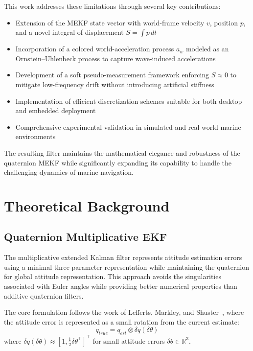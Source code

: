 \documentclass[11pt,letterpaper]{article}
\begin{document}
This work addresses these limitations through several key contributions:
\begin{itemize}
  \item Extension of the MEKF state vector with world-frame velocity $v$, position $p$, and a novel integral of displacement $S=\int p\,dt$
  \item Incorporation of a colored world-acceleration process $a_w$ modeled as an Ornstein--Uhlenbeck process to capture wave-induced accelerations
  \item Development of a soft pseudo-measurement framework enforcing $S\approx 0$ to mitigate low-frequency drift without introducing artificial stiffness
  \item Implementation of efficient discretization schemes suitable for both desktop and embedded deployment
  \item Comprehensive experimental validation in simulated and real-world marine environments
\end{itemize}

The resulting filter maintains the mathematical elegance and robustness of the quaternion MEKF while significantly expanding its capability to handle the challenging dynamics of marine navigation.

\section{Theoretical Background}
\label{sec:background}

\subsection{Quaternion Multiplicative EKF}

The multiplicative extended Kalman filter represents attitude estimation errors using a minimal three-parameter representation while maintaining the quaternion for global attitude representation. This approach avoids the singularities associated with Euler angles while providing better numerical properties than additive quaternion filters.

The core formulation follows the work of Lefferts, Markley, and Shuster~\cite{lefferts1982,markley2003}, where the attitude error is represented as a small rotation from the current estimate:
\[
q_{true} = q_{est} \otimes \delta q(\delta\theta)
\]
where $\delta q(\delta\theta) \approx [1, \tfrac{1}{2}\delta\theta^\top]^\top$ for small attitude errors $\delta\theta \in \mathbb{R}^3$.
\end{document}
